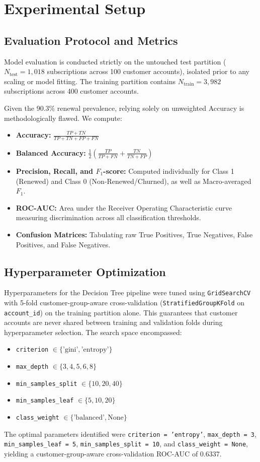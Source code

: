 \documentclass[pdflatex,sn-mathphys-num]{sn-jnl}
\begin{document}
\section{Experimental Setup}\label{sec:experiments}

\subsection{Evaluation Protocol and Metrics}
Model evaluation is conducted strictly on the untouched test partition ($N_{\text{test}} = 1{,}018$ subscriptions across 100 customer accounts), isolated prior to any scaling or model fitting. The training partition contains $N_{\text{train}} = 3{,}982$ subscriptions across 400 customer accounts.

Given the 90.3\% renewal prevalence, relying solely on unweighted Accuracy is methodologically flawed. We compute:
\begin{itemize}
    \item \textbf{Accuracy:} $\frac{TP + TN}{TP + TN + FP + FN}$
    \item \textbf{Balanced Accuracy:} $\frac{1}{2} \left( \frac{TP}{TP + FN} + \frac{TN}{TN + FP} \right)$
    \item \textbf{Precision, Recall, and $F_1$-score:} Computed individually for Class 1 (Renewed) and Class 0 (Non-Renewed/Churned), as well as Macro-averaged $F_1$.
    \item \textbf{ROC-AUC:} Area under the Receiver Operating Characteristic curve measuring discrimination across all classification thresholds.
    \item \textbf{Confusion Matrices:} Tabulating raw True Positives, True Negatives, False Positives, and False Negatives.
\end{itemize}

\subsection{Hyperparameter Optimization}
Hyperparameters for the Decision Tree pipeline were tuned using \texttt{GridSearchCV} with 5-fold customer-group-aware cross-validation (\texttt{StratifiedGroupKFold} on \texttt{account\_id}) on the training partition alone. This guarantees that customer accounts are never shared between training and validation folds during hyperparameter selection. The search space encompassed:
\begin{itemize}
    \item \texttt{criterion} $\in \{\text{'gini'}, \text{'entropy'}\}$
    \item \texttt{max\_depth} $\in \{3, 4, 5, 6, 8\}$
    \item \texttt{min\_samples\_split} $\in \{10, 20, 40\}$
    \item \texttt{min\_samples\_leaf} $\in \{5, 10, 20\}$
    \item \texttt{class\_weight} $\in \{\text{'balanced'}, \text{None}\}$
\end{itemize}
The optimal parameters identified were \texttt{criterion = 'entropy'}, \texttt{max\_depth = 3}, \texttt{min\_samples\_leaf = 5}, \texttt{min\_samples\_split = 10}, and \texttt{class\_weight = None}, yielding a customer-group-aware cross-validation ROC-AUC of 0.6337.
\end{document}
